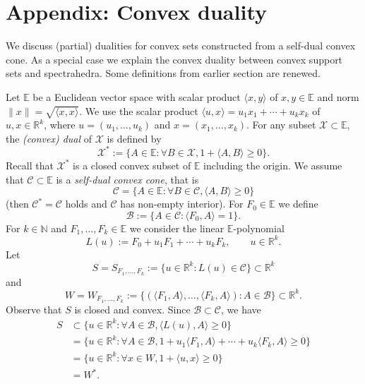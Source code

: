 \documentclass[12pt]{amsart}
\theoremstyle{definition}
\numberwithin{equation}{section}
\begin{document}
\section{Appendix: Convex duality}
\label{sec:convex_duality}
\par 
We discuss (partial) dualities for convex sets constructed from a self-dual 
convex cone. As a special case we explain the convex duality between convex 
support sets and spectrahedra. Some definitions from earlier section are 
renewed.
\par
Let ${\mathbb E}$ be a Euclidean vector space with scalar product 
$\langle x,y\rangle$ of $x,y\in{\mathbb E}$ and norm $\|x\|=\sqrt{\langle x,x\rangle}$. 
We use the scalar product $\langle u,x\rangle=u_1x_1+\cdots+u_kx_k$ of 
$u,x\in{\mathbb R}^k$, where $u=(u_1,\ldots,u_k)$ and $x=(x_1,\ldots,x_k)$. For any 
subset ${\mathcal X}\subset{\mathbb E}$, the {\em (convex) dual} of ${\mathcal X}$ is defined by
\[
{\mathcal X}^*:=\{A\in{\mathbb E} : \forall B\in{\mathcal X}, 1+\langle A,B\rangle\geq 0\}.
\]
Recall that ${\mathcal X}^*$ is a closed convex subset of ${\mathbb E}$ including the origin. 
We assume that ${\mathcal C}\subset{\mathbb E}$ is a {\em self-dual convex cone}, that is
\[
{\mathcal C}=\{A\in{\mathbb E} : \forall B\in {\mathcal C}, \langle A,B\rangle\geq 0\}
\]
(then ${\mathcal C}^*={\mathcal C}$ holds and ${\mathcal C}$ has non-empty interior). For $F_0\in{\mathbb E}$ 
we define
\[
{\mathcal B}:=\{A\in{\mathcal C} : \langle F_0,A \rangle =1 \}.
\]
For $k\in{\mathbb N}$ and $F_1,\ldots,F_k\in{\mathbb E}$ we consider the linear 
${\mathbb E}$-polynomial 
\[
L(u):=F_0+u_1F_1+\cdots+u_kF_k,
\qquad u\in{\mathbb R}^k.
\]
Let
\begin{equation}\label{eq:sectra}
S=S_{F_1,\ldots,F_k}:=\{u\in{\mathbb R}^k : L(u)\in{\mathcal C}\} \subset{\mathbb R}^k
\end{equation}
and 
\begin{equation}\label{eq:conv_supp}
W=W_{F_1,\ldots,F_k}
:=\{(\langle F_1,A\rangle,\ldots,\langle F_k,A\rangle) : A\in{\mathcal B}\}\subset{\mathbb R}^k.
\end{equation}
Observe that $S$ is closed and convex. Since ${\mathcal B}\subset{\mathcal C}$, we have
\begin{align}\label{eq:duality01}
S &\subset \{u\in{\mathbb R}^k : \forall A\in{\mathcal B}, \langle L(u),A\rangle\geq 0 \}\\\nonumber
 &= \{u\in{\mathbb R}^k : \forall A\in{\mathcal B}, 
 1+u_1\langle F_1,A\rangle+\cdots+u_k\langle F_k,A\rangle \geq 0 \}\\\nonumber
 &= \{u\in{\mathbb R}^k : \forall x\in W, 
 1+\langle u,x\rangle \geq 0 \}\\\nonumber
 &= W^*.\nonumber
\end{align}
\end{document}
